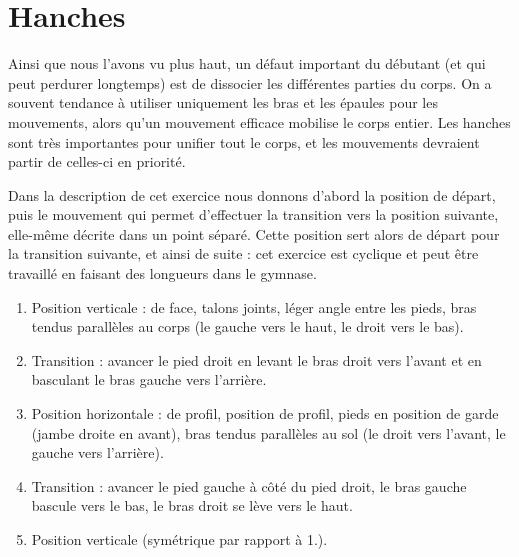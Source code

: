 \section{Hanches}


Ainsi que nous l'avons vu plus haut, un défaut important du débutant (et qui peut perdurer longtemps) est de dissocier les différentes parties du corps.
On a souvent tendance à utiliser uniquement les bras et les épaules pour les mouvements, alors qu'un mouvement efficace mobilise le corps entier.
Les hanches sont très importantes pour unifier tout le corps, et les mouvements devraient partir de celles-ci en priorité.


\begin{exercice}
	\label{struc:ex:roue-avant}
	


	Dans la description de cet exercice nous donnons d'abord la position de départ, puis le mouvement qui permet d'effectuer la transition vers la position suivante, elle-même décrite dans un point séparé.
	Cette position sert alors de départ pour la transition suivante, et ainsi de suite : cet exercice est cyclique et peut être travaillé en faisant des longueurs dans le gymnase.

	\begin{enumerate}
		\item Position verticale : de face, talons joints, léger angle entre les pieds, bras tendus parallèles au corps (le gauche vers le haut, le droit vers le bas).
		
		\item Transition : avancer le pied droit en levant le bras droit vers l'avant et en basculant le bras gauche vers l'arrière.
		
		\item Position horizontale : de profil, position de profil, pieds en position de garde (jambe droite en avant), bras tendus parallèles au sol (le droit vers l'avant, le gauche vers l'arrière).
		
		\item Transition : avancer le pied gauche à côté du pied droit, le bras gauche bascule vers le bas, le bras droit se lève vers le haut.
		
		\item Position verticale (symétrique par rapport à 1.).
	\end{enumerate}


\end{exercice}
